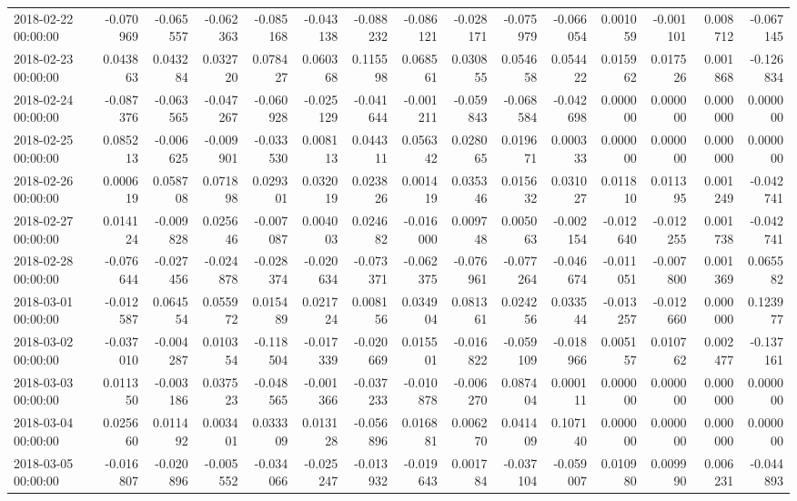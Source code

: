 \begin{tabular}{lrrrrrrrrrrrrrr}
2018-02-22 00:00:00 & -0.070969 & -0.065557 & -0.062363 & -0.085168 & -0.043138 & -0.088232 & -0.086121 & -0.028171 & -0.075979 & -0.066054 & 0.001059 & -0.001101 & 0.008712 & -0.067145 \\
2018-02-23 00:00:00 & 0.043863 & 0.043284 & 0.032720 & 0.078427 & 0.060368 & 0.115598 & 0.068561 & 0.030855 & 0.054658 & 0.054422 & 0.015962 & 0.017526 & 0.001868 & -0.126834 \\
2018-02-24 00:00:00 & -0.087376 & -0.063565 & -0.047267 & -0.060928 & -0.025129 & -0.041644 & -0.001211 & -0.059843 & -0.068584 & -0.042698 & 0.000000 & 0.000000 & 0.000000 & 0.000000 \\
2018-02-25 00:00:00 & 0.085213 & -0.006625 & -0.009901 & -0.033530 & 0.008113 & 0.044311 & 0.056342 & 0.028065 & 0.019671 & 0.000333 & 0.000000 & 0.000000 & 0.000000 & 0.000000 \\
2018-02-26 00:00:00 & 0.000619 & 0.058708 & 0.071898 & 0.029301 & 0.032019 & 0.023826 & 0.001419 & 0.035346 & 0.015632 & 0.031027 & 0.011810 & 0.011395 & 0.001249 & -0.042741 \\
2018-02-27 00:00:00 & 0.014124 & -0.009828 & 0.025646 & -0.007087 & 0.004003 & 0.024682 & -0.016000 & 0.009748 & 0.005063 & -0.002154 & -0.012640 & -0.012255 & 0.001738 & -0.042741 \\
2018-02-28 00:00:00 & -0.076644 & -0.027456 & -0.024878 & -0.028374 & -0.020634 & -0.073371 & -0.062375 & -0.076961 & -0.077264 & -0.046674 & -0.011051 & -0.007800 & 0.001369 & 0.065582 \\
2018-03-01 00:00:00 & -0.012587 & 0.064554 & 0.055972 & 0.015489 & 0.021724 & 0.008156 & 0.034904 & 0.081361 & 0.024256 & 0.033544 & -0.013257 & -0.012660 & 0.000000 & 0.123977 \\
2018-03-02 00:00:00 & -0.037010 & -0.004287 & 0.010354 & -0.118504 & -0.017339 & -0.020669 & 0.015501 & -0.016822 & -0.059109 & -0.018966 & 0.005157 & 0.010762 & 0.002477 & -0.137161 \\
2018-03-03 00:00:00 & 0.011350 & -0.003186 & 0.037523 & -0.048565 & -0.001366 & -0.037233 & -0.010878 & -0.006270 & 0.087404 & 0.000111 & 0.000000 & 0.000000 & 0.000000 & 0.000000 \\
2018-03-04 00:00:00 & 0.025660 & 0.011492 & 0.003401 & 0.033309 & 0.013128 & -0.056896 & 0.016881 & 0.006270 & 0.041409 & 0.107140 & 0.000000 & 0.000000 & 0.000000 & 0.000000 \\
2018-03-05 00:00:00 & -0.016807 & -0.020896 & -0.005552 & -0.034066 & -0.025247 & -0.013932 & -0.019643 & 0.001784 & -0.037104 & -0.059007 & 0.010980 & 0.009990 & 0.006231 & -0.044893 \\

\end{tabular}
